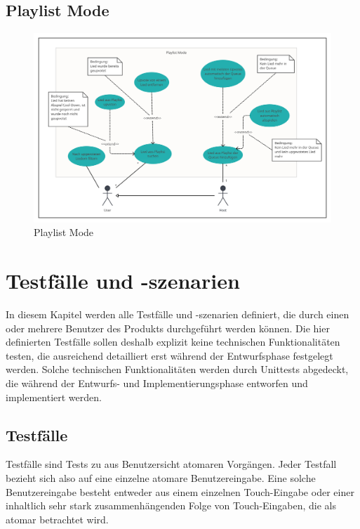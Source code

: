 \documentclass[oneside, ngerman]{sdqtechreport}
\begin{document}
\newpage

\section{Playlist Mode}
\label{sec:Anwendungsfälle:Playlist Mode}

\begin{figure}[h]
    \includegraphics[width = 18cm]{LATEX/Pflichtenheft/GraphicDesigns/Use Case Playlist Mode.png}
    \caption{Playlist Mode}
    \label{fig:Use Case Playlist Mode}
\end{figure}



\chapter{Testfälle und -szenarien}
\label{chap:Tests}

In diesem Kapitel werden alle Testfälle und -szenarien definiert, die durch einen oder mehrere Benutzer des Produkts durchgeführt werden können. Die hier definierten Testfälle sollen deshalb explizit keine technischen Funktionalitäten testen, die ausreichend detailliert erst während der Entwurfsphase festgelegt werden. Solche technischen Funktionalitäten werden durch Unittests abgedeckt, die während der Entwurfs- und Implementierungsphase entworfen und implementiert werden.

\section{Testfälle}
\label{sec:Tests:Testfälle}

Testfälle sind Tests zu aus Benutzersicht atomaren Vorgängen. Jeder Testfall bezieht sich also auf eine einzelne atomare Benutzereingabe. Eine solche Benutzereingabe besteht entweder aus einem einzelnen Touch-Eingabe oder einer inhaltlich sehr stark zusammenhängenden Folge von Touch-Eingaben, die als atomar betrachtet wird.
\end{document}

